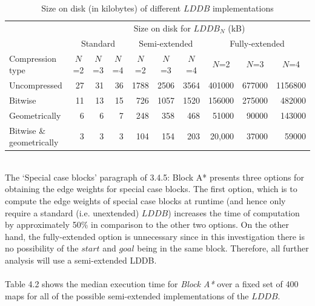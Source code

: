 \documentclass[12pt,notitlepage]{report}
\begin{document}
\begin{table}
\centering
\begin{tabularx}{\textwidth}{@{}lrrrrrrrrr@{}} \toprule
~ &\multicolumn{9}{c}{Size on disk for $LDDB_{N}$ (kB)}\\ 
\cmidrule(l){2-10}
~ &\multicolumn{3}{c}{Standard} &\multicolumn{3}{c}{Semi-extended} &\multicolumn{3}{c}{Fully-extended}\\ 
\cmidrule(l){2-4} \cmidrule(l){5-7} \cmidrule(l){8-10}
Compression type &\multicolumn{1}{c}{$N$=2} &\multicolumn{1}{c}{$N$=3} &\multicolumn{1}{c}{$N$=4} & \multicolumn{1}{c}{$N$=2} &\multicolumn{1}{c}{$N$=3} &\multicolumn{1}{c}{$N$=4} & \multicolumn{1}{c}{$N$=2} &\multicolumn{1}{c}{$N$=3} &\multicolumn{1}{c}{$N$=4}\\  \midrule
    Uncompressed                        & 27  & 31     & 36     & 1788   & 2506    & 3564 & 401000     & 677000          & 1156800   \\ 
    Bitwise                  & 11       & 13    & 15 & 726      & 1057   & 1520  & 156000      & 275000  & 482000   \\
    Geometrically      & 6        & 6   & 7   & 248      & 358           & 468    & 51000 & 90000     & 143000        \\ 
    Bitwise \& geometrically & 3        & 3  & 3   & 104      & 154           & 203  & 20,000      & 37000           & 59000  \\ \bottomrule
\end{tabularx}
\caption[Size on disk of different $LDDB$ implementations]{Size on disk (in kilobytes) of different $LDDB$ implementations}
\end{table}

\\
\noindent
The `Special case blocks' paragraph of 3.4.5: Block A* presents three options for obtaining the edge weights for special case blocks. The first option, which is to compute the edge weights of special case blocks at runtime (and hence only require a standard (i.e. unextended) $LDDB$) increases the time of computation by approximately 50\% in comparison to the other two options. On the other hand, the fully-extended option is unnecessary since in this investigation there is no possibility of the $start$ and $goal$ being in the same block. Therefore, all further analysis will use a semi-extended LDDB.\\

\\
\noindent
Table 4.2 shows the median execution time for {\em Block A*} over a fixed set of 400 maps for all of the possible semi-extended implementations of the $LDDB$.\\
\end{document}
